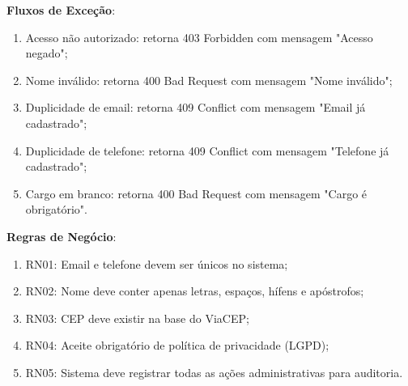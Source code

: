 \begin{itemize}[topsep=1pt, itemsep=0pt]
  \textbf{Fluxos de Exceção}:
  \begin{enumerate}
    \item Acesso não autorizado: retorna 403 Forbidden com mensagem "Acesso negado";
    \item Nome inválido: retorna 400 Bad Request com mensagem "Nome inválido";
    \item Duplicidade de email: retorna 409 Conflict com mensagem "Email já cadastrado";
    \item Duplicidade de telefone: retorna 409 Conflict com mensagem "Telefone já cadastrado";
    \item Cargo em branco: retorna 400 Bad Request com mensagem "Cargo é obrigatório".
  \end{enumerate}

  \textbf{Regras de Negócio}:
  \begin{enumerate}[topsep=1pt]
    \item RN01: Email e telefone devem ser únicos no sistema;
    \item RN02: Nome deve conter apenas letras, espaços, hífens e apóstrofos;
    \item RN03: CEP deve existir na base do ViaCEP;
    \item RN04: Aceite obrigatório de política de privacidade (LGPD);
    \item RN05: Sistema deve registrar todas as ações administrativas para auditoria.
  \end{enumerate}
\end{itemize}
